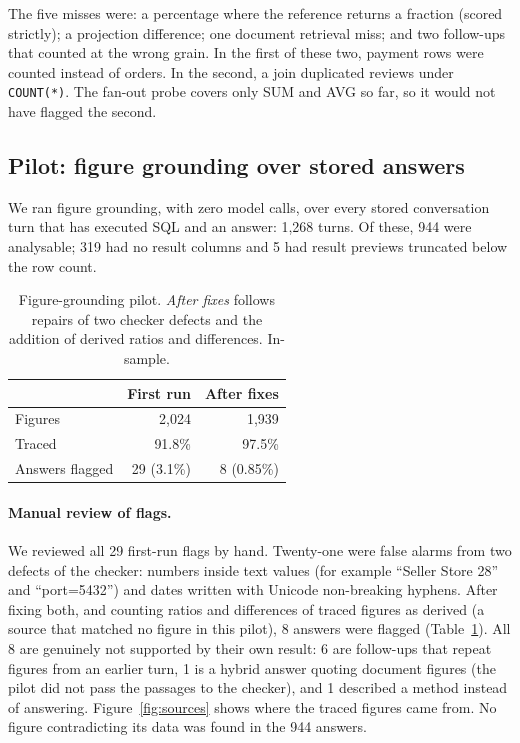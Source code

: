 \documentclass[10pt,twocolumn]{article}
\begin{document}
The five misses were: a percentage where the reference returns a fraction (scored strictly); a projection difference; one document retrieval miss; and two follow-ups that counted at the wrong grain. In the first of these two, payment rows were counted instead of orders. In the second, a join duplicated reviews under \texttt{COUNT(*)}. The fan-out probe covers only SUM and AVG so far, so it would not have flagged the second.

\subsection{Pilot: figure grounding over stored answers}
We ran figure grounding, with zero model calls, over every stored conversation turn that has executed SQL and an answer: 1,268 turns. Of these, 944 were analysable; 319 had no result columns and 5 had result previews truncated below the row count.

\begin{table}[t]
\centering\small
\caption{Figure-grounding pilot. \emph{After fixes} follows repairs of two checker defects and the addition of derived ratios and differences. In-sample.}\label{tab:pilot}
\begin{tabular}{@{}lrr@{}}
\toprule
 & First run & After fixes \\
\midrule
Figures & 2,024 & 1,939 \\
Traced & 91.8\% & 97.5\% \\
Answers flagged & 29 (3.1\%) & 8 (0.85\%) \\
\bottomrule
\end{tabular}
\end{table}

\paragraph{Manual review of flags.} We reviewed all 29 first-run flags by hand. Twenty-one were false alarms from two defects of the checker: numbers inside text values (for example ``Seller Store 28'' and ``port=5432'') and dates written with Unicode non-breaking hyphens. After fixing both, and counting ratios and differences of traced figures as derived (a source that matched no figure in this pilot), 8 answers were flagged (Table~\ref{tab:pilot}). All 8 are genuinely not supported by their own result: 6 are follow-ups that repeat figures from an earlier turn, 1 is a hybrid answer quoting document figures (the pilot did not pass the passages to the checker), and 1 described a method instead of answering. Figure~\ref{fig:sources} shows where the traced figures came from. No figure contradicting its data was found in the 944 answers.
\end{document}
